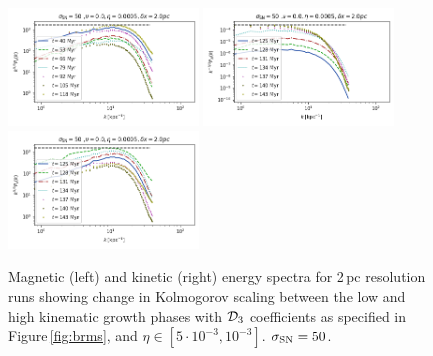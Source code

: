 \documentclass[iop,apj,numberedappendix,twocolappendix]{emulateapj}
\begin{document}
\begin{figure}
\includegraphics[trim=0.0cm 0.00cm 0.0cm 0.0cm,clip=true,width=0.45\textwidth]{csc_figs/2pcPm0e-3_3kpower.png}
\includegraphics[trim=0.0cm 0.00cm 0.0cm 0.0cm,clip=true,width=0.45\textwidth]{csc_figs/2pcPm0e-3_bBpower.png}
\includegraphics[trim=0.0cm 0.00cm 0.0cm 0.0cm,clip=true,width=0.45\textwidth]{csc_figs/2pcPm0e-3_bkpower.png}
\caption{
Magnetic (left) and kinetic (right) energy spectra for 2\,pc resolution runs 
showing change in Kolmogorov scaling between
 the low and high kinematic growth phases with ${\cal D}_3$ 
coefficients as specified in Figure\,\ref{fig:brms}, and $\eta\in[5\cdot10^{-3},10^{-3}]$. $\sigma_{\rm SN}=50$.
\label{fig:4spectraRm}
}
\end{figure}
\end{document}
